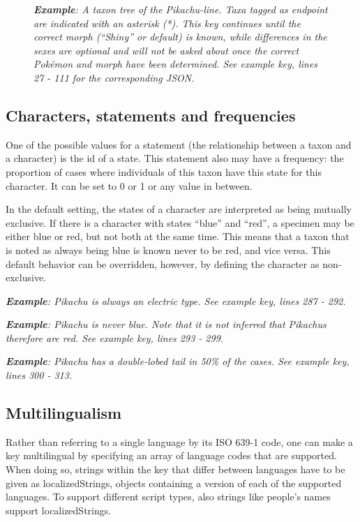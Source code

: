 \documentclass[10pt,letterpaper]{article}
\begin{document}
\begin{figure}[!h]
  \caption{\textit{\textbf{Example}:
A taxon tree of the Pikachu-line. Taxa tagged as endpoint are indicated with an asterisk (*). This key continues until the correct morph (``Shiny'' or default) is known, while differences in the sexes are optional and will not be asked about once the correct Pokémon and morph have been determined. See example key, lines 27 - 111 for the corresponding JSON.
  }}
  \label{fig3}
\end{figure}
\subsection*{
Characters, statements and frequencies
}
One of the possible values for a statement (the relationship between a taxon and a character) is the id of a state. This statement also may have a frequency: the proportion of cases where individuals of this taxon have this state for this character. It can be set to 0 or 1 or any value in between.

In the default setting, the states of a character are interpreted as being mutually exclusive. If there is a character with states ``blue'' and ``red'', a specimen may be either blue or red, but not both at the same time. This means that a taxon that is noted as always being blue is known never to be red, and vice versa. This default behavior can be overridden, however, by defining the character as non-exclusive.


\textit{\textbf{Example}: Pikachu is always an electric type. See example key, lines 287 - 292.}


\textit{\textbf{Example}: Pikachu is never blue. Note that it is not inferred that Pikachus therefore are red. See example key, lines 293 - 299.}


\textit{\textbf{Example}: Pikachu has a double-lobed tail in 50\% of the cases. See example key, lines 300 - 313.}
\subsection*{
Multilingualism
}
Rather than referring to a single language by its ISO 639-1 code, one can make a key multilingual by specifying an array of language codes that are supported. When doing so, strings within the key that differ between languages have to be given as localizedStrings, objects containing a version of each of the supported languages. To support different script types, also strings like people's names support localizedStrings.
\end{document}

